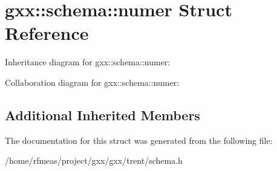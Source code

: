 \hypertarget{structgxx_1_1schema_1_1numer}{}\section{gxx\+:\+:schema\+:\+:numer Struct Reference}
\label{structgxx_1_1schema_1_1numer}


Inheritance diagram for gxx\+:\+:schema\+:\+:numer\+:


Collaboration diagram for gxx\+:\+:schema\+:\+:numer\+:
\subsection*{Additional Inherited Members}


The documentation for this struct was generated from the following file\+:\begin{DoxyCompactItemize}
\item 
/home/rfmeas/project/gxx/gxx/trent/schema.\+h\end{DoxyCompactItemize}

